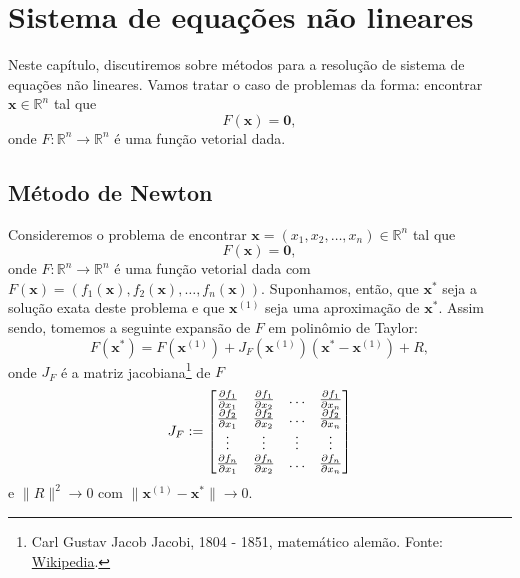 

\chapter{Sistema de equações não lineares}\label{cap_snl}
\thispagestyle{fancy}

Neste capítulo, discutiremos sobre métodos para a resolução de sistema de equações não lineares. Vamos tratar o caso de problemas da forma: encontrar $\pmb{x}\in\mathbb{R}^n$ tal que
\begin{equation}
  F(\pmb{x}) = \pmb{0},
\end{equation}
onde $F:\mathbb{R}^n\to\mathbb{R}^n$ é uma função vetorial dada.

\section{Método de Newton}\label{cap_snl_sec_newton}

Consideremos o problema de encontrar $\pmb{x} = (x_1, x_2, \dotsc, x_n)\in\mathbb{R}^n$ tal que
\begin{equation}
  F(\pmb{x}) = \pmb{0},
\end{equation}
onde $F:\mathbb{R}^n\to\mathbb{R}^n$ é uma função vetorial dada com $F(\pmb{x}) = (f_1(\pmb{x}), f_2(\pmb{x}), \dotsc, f_n(\pmb{x}))$. Suponhamos, então, que $\pmb{x}^*$ seja a solução exata deste problema e que $\pmb{x}^{(1)}$ seja uma aproximação de $\pmb{x}^*$. Assim sendo, tomemos a seguinte expansão de $F$ em polinômio de Taylor:
\begin{equation}
  F(\pmb{x}^*) = F(\pmb{x}^{(1)}) + J_F(\pmb{x}^{(1)})(\pmb{x}^*-\pmb{x}^{(1)}) + R,
\end{equation}
onde $J_F$ é a matriz jacobiana\footnote{Carl Gustav Jacob Jacobi, 1804 - 1851, matemático alemão. Fonte: \href{https://en.wikipedia.org/wiki/Carl_Gustav_Jacob_Jacobi}{Wikipedia}.} de $F$
\begin{equation}
  J_F :=
  \begin{bmatrix}
    \frac{\partial f_1}{\partial x_1} & \frac{\partial f_1}{\partial x_2} & \ldots & \frac{\partial f_1}{\partial x_n}\\
    \frac{\partial f_2}{\partial x_1} & \frac{\partial f_2}{\partial x_2} & \ldots & \frac{\partial f_2}{\partial x_n}\\
    \vdots & \vdots & \vdots & \vdots \\
    \frac{\partial f_n}{\partial x_1} & \frac{\partial f_n}{\partial x_2} & \ldots & \frac{\partial f_n}{\partial x_n}\\
  \end{bmatrix}
\end{equation}
e $\|R\|^2\to 0$ com $\|\pmb{x}^{(1)}-\pmb{x}^*\|\to 0$. 

